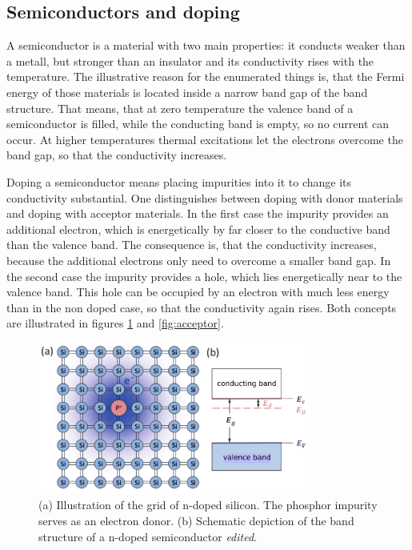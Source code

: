 \subsection{Semiconductors and doping}

A semiconductor is a material with two main properties: it conducts weaker than a metall, but stronger than an insulator and
its conductivity rises with the temperature. The illustrative reason for the enumerated things is, that the Fermi energy of
those materials is located inside a narrow band gap of the band structure. That means, that at zero temperature the valence band of a semiconductor is
filled, while the conducting band is empty, so no current can occur. At higher temperatures thermal excitations let the electrons overcome
the band gap, so that the conductivity increases.

Doping a semiconductor means placing impurities into it to change its conductivity substantial.
One distinguishes between doping with donor materials and doping with acceptor materials.
In the first case the impurity provides an additional electron, which is energetically by far closer to the
conductive band than the valence band. The consequence is, that the conductivity increases, because
the additional electrons only need to overcome a smaller band gap. In the second case the impurity
provides a hole, which lies energetically near to the valence band. This hole can be occupied by an electron
with much less energy than in the non doped case, so that the conductivity again rises.
Both concepts are illustrated in figures \ref{fig:donor} and \ref{fig:acceptor}.

\begin{figure}
  \centering
  \includegraphics[height=5cm]{Ordnername/donor_edit.pdf}
  \caption{(a) Illustration of the grid of n-doped silicon. The phosphor impurity serves as an electron donor.
  (b) Schematic depiction of the band structure of a n-doped semiconductor \cite{semiconductors} \textit{edited}.}
  \label{fig:donor}
\end{figure}

